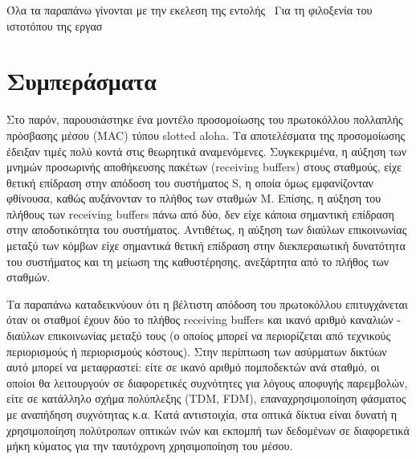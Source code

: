 \documentclass[12pt]{report}
\begin{document}
Όλα τα παραπάνω γίνονται με την εκελεση της εντολής \
Για τη φιλοξενία του ιστοτόπου της εργασ

\section{Συμπεράσματα}
Στο παρόν, παρουσιάστηκε ένα μοντέλο προσομοίωσης του πρωτοκόλλου πολλαπλής πρόσβασης μέσου (\textlatin{MAC}) τύπου \textlatin{slotted aloha}. Τα αποτελέσματα της προσομοίωσης έδειξαν τιμές πολύ κοντά στις θεωρητικά αναμενόμενες. Συγκεκριμένα, η αύξηση των μνημών προσωρινής αποθήκευσης πακέτων (\textlatin{receiving buffers}) στους σταθμούς, είχε θετική επίδραση στην απόδοση του συστήματος \textlatin{S}, η οποία όμως εμφανίζονταν φθίνουσα, καθώς αυξάνονταν το πλήθος των σταθμών \textlatin{M}. Επίσης, η αύξηση του πλήθους των \textlatin{receiving buffers} πάνω από δύο, δεν είχε κάποια σημαντική επίδραση στην αποδοτικότητα του συστήματος. Αντιθέτως, η αύξηση των διαύλων επικοινωνίας μεταξύ των κόμβων είχε σημαντικά θετική επίδραση στην διεκπεραιωτική δυνατότητα του συστήματος και τη μείωση της καθυστέρησης, ανεξάρτητα από το πλήθος των σταθμών.

Τα παραπάνω καταδεικνύουν ότι η βέλτιστη απόδοση του πρωτοκόλλου επιτυγχάνεται όταν οι σταθμοί έχουν δύο το πλήθος \textlatin{receiving buffers} και ικανό αριθμό καναλιών - διαύλων επικοινωνίας μεταξύ τους (ο οποίος μπορεί να περιορίζεται από τεχνικούς περιορισμούς ή περιορισμούς κόστους). Στην περίπτωση των ασύρματων δικτύων αυτό μπορεί να μεταφραστεί: είτε σε ικανό αριθμό πομποδεκτών ανά σταθμό, οι οποίοι θα λειτουργούν σε διαφορετικές συχνότητες για λόγους αποφυγής παρεμβολών, είτε σε κατάλληλο σχήμα πολύπλεξης (\textlatin{TDM, FDM}), επαναχρησιμοποίηση φάσματος με αναπήδηση συχνότητας κ.α. Κατά αντιστοιχία, στα οπτικά δίκτυα είναι δυνατή η χρησιμοποίηση πολύτροπων οπτικών ινών και εκπομπή των δεδομένων σε διαφορετικά μήκη κύματος για την ταυτόχρονη χρησιμοποίηση του μέσου.

\begin{appendices}

\end{appendices}

\appendix



\end{document}
